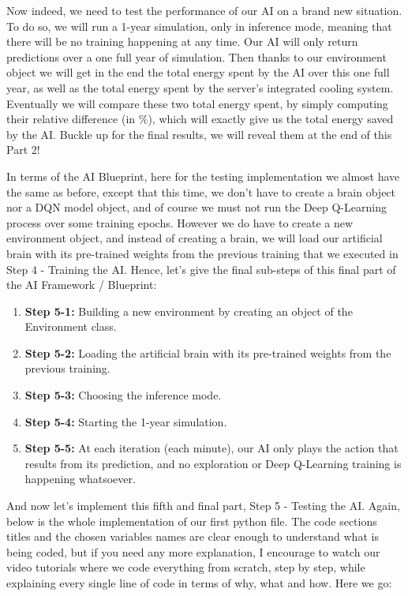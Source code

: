 \documentclass[]{book}
\begin{document}
Now indeed, we need to test the performance of our AI on a brand new situation. To do so, we will run a 1-year simulation, only in inference mode, meaning that there will be no training happening at any time. Our AI will only return predictions over a one full year of simulation. Then thanks to our environment object we will get in the end the total energy spent by the AI over this one full year, as well as the total energy spent by the server's integrated cooling system. Eventually we will compare these two total energy spent, by simply computing their relative difference (in \%), which will exactly give us the total energy saved by the AI. Buckle up for the final results, we will reveal them at the end of this Part 2!

In terms of the AI Blueprint, here for the testing implementation we almost have the same as before, except that this time, we don't have to create a brain object nor a DQN model object, and of course we must not run the Deep Q-Learning process over some training epochs. However we do have to create a new environment object, and instead of creating a brain, we will load our artificial brain with its pre-trained weights from the previous training that we executed in Step 4 - Training the AI. Hence, let's give the final sub-steps of this final part of the AI Framework / Blueprint:

\begin{enumerate}
    \item \textbf{Step 5-1:} Building a new environment by creating an object of the Environment class.
    \item \textbf{Step 5-2:} Loading the artificial brain with its pre-trained weights from the previous training.
    \item \textbf{Step 5-3:} Choosing the inference mode.
    \item \textbf{Step 5-4:} Starting the 1-year simulation.
    \item \textbf{Step 5-5:} At each iteration (each minute), our AI only plays the action that results from its prediction, and no exploration or Deep Q-Learning training is happening whatsoever.
\end{enumerate}

And now let's implement this fifth and final part, Step 5 - Testing the AI. Again, below is the whole implementation of our first python file. The code sections titles and the chosen variables names are clear enough to understand what is being coded, but if you need any more explanation, I encourage to watch our video tutorials where we code everything from scratch, step by step, while explaining every single line of code in terms of why, what and how. Here we go:
\end{document}
